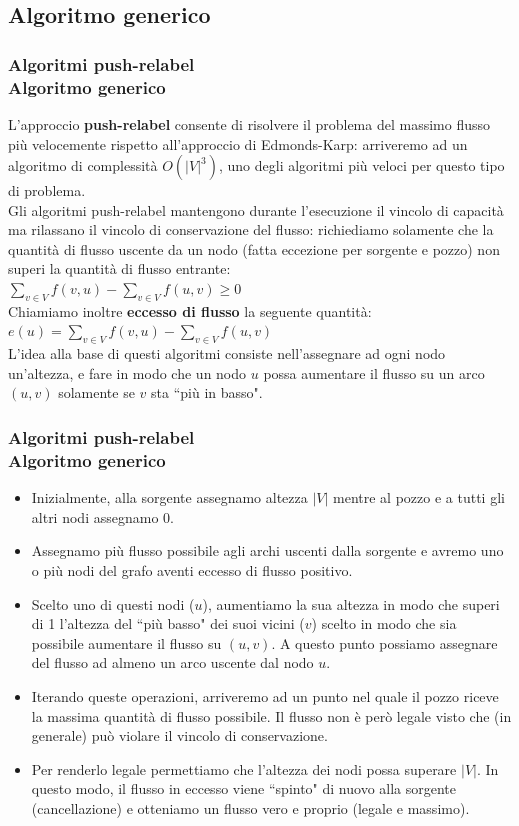 \documentclass{beamer}
\begin{document}
\subsection{Algoritmo generico}

\begin{frame}
\frametitle{Algoritmi push-relabel\\Algoritmo generico}
L'approccio \textbf{push-relabel} consente di risolvere il problema del massimo flusso più velocemente rispetto all'approccio di Edmonds-Karp: arriveremo ad un algoritmo di complessità $O(|V|^3)$, uno degli algoritmi più veloci per questo tipo di problema.\\
Gli algoritmi push-relabel mantengono durante l'esecuzione il vincolo di capacità ma rilassano il vincolo di conservazione del flusso: richiediamo solamente che la quantità di flusso uscente da un nodo (fatta eccezione per sorgente e pozzo) non superi la quantità di flusso entrante:\\
$\sum\limits_{v\in V}f(v,u)-\sum\limits_{v\in V}f(u,v)\geq 0$\\
Chiamiamo inoltre \textbf{eccesso di flusso} la seguente quantità:\\
$e(u)=\sum\limits_{v\in V}f(v,u)-\sum\limits_{v\in V}f(u,v)$\\
L'idea alla base di questi algoritmi consiste nell'assegnare ad ogni nodo un'altezza, e fare in modo che un nodo $u$ possa aumentare il flusso su un arco $(u,v)$ solamente se $v$ sta ``più in basso".
\end{frame}

\begin{frame}
\frametitle{Algoritmi push-relabel\\Algoritmo generico}
\begin{itemize}
\item Inizialmente, alla sorgente assegnamo altezza $|V|$ mentre al pozzo e a tutti gli altri nodi assegnamo 0.
\item Assegnamo più flusso possibile agli archi uscenti dalla sorgente e avremo uno o più nodi del grafo aventi eccesso di flusso positivo.
\item Scelto uno di questi nodi ($u$), aumentiamo la sua altezza in modo che superi di 1 l'altezza del ``più basso" dei suoi vicini ($v$) scelto in modo che sia possibile aumentare il flusso su $(u,v)$. A questo punto possiamo assegnare del flusso ad almeno un arco uscente dal nodo $u$.
\item Iterando queste operazioni, arriveremo ad un punto nel quale il pozzo riceve la massima quantità di flusso possibile. Il flusso non è però legale visto che (in generale) può violare il vincolo di conservazione.
\item Per renderlo legale permettiamo che l'altezza dei nodi possa superare $|V|$. In questo modo, il flusso in eccesso viene ``spinto" di nuovo alla sorgente (cancellazione) e otteniamo un flusso vero e proprio (legale e massimo).
\end{itemize}
\end{frame}
\end{document}
